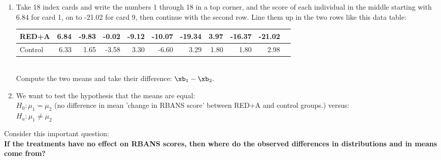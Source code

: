 \begin{enumerate}
\begin{minipage}{.6\linewidth}
   Shape
\begin{students}
    \vspace{1.4cm}    
\end{students}

\begin{key}
  {\it            RED+A seems most symmetric (boxplot), Cotrol
         has some outliers.
}
\end{key}
\end{minipage}


The researchers used a computer randomization to assign the 
subjects into the groups. We'll shuffle cards instead. 

\item  Take 18 index cards and write the numbers 1 through 18 in a top
  corner, and the score of each individual in the middle starting with
  6.84 for card 1, on to -21.02 for card 9, then continue with the
  second row. Line them up in the two rows  like this data table: 

  \begin{tabular}{l|rrrrrrrrrr} \hline
RED+A & 6.84&-9.83&-0.02&-9.12&-10.07&-19.34&3.97&-16.37&-21.02&\\ \hline
Control&6.33&1.65&-3.58&3.30&-6.60&3.29&1.80&1.80&2.98&\\ \hline
\end{tabular}\\
Compute the two means and take their difference: $\xb_1 - \xb_2$.
\vspace{1in}


\item We want to test the hypothesis that the means are equal:\\
  $H_0: \mu_1 = \mu_2$  (no difference in mean 'change in RBANS score'
  between RED+A and control groups.)  versus:\\
  $H_a:  \mu_1 \neq \mu_2$\\
\end{enumerate}
Consider this important question:\\

{\bf \sf
If the treatments have no effect on RBANS scores, then where do the
observed differences in distributions and in means come from?
}\vspace*{.2cm}


